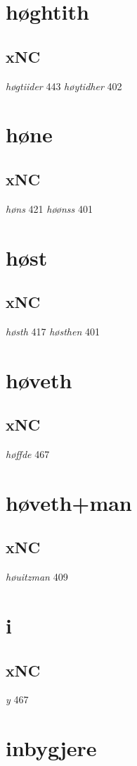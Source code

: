 \documentclass[a4paper,twocolumn]{article}
\begin{document}
\section{høghtith}
\label{sec:org12bb438}
\subsection{xNC}
\label{sec:org15979c0}
\emph{høgtiider} 443 \emph{høytidher} 402 
\section{høne}
\label{sec:org8ffc534}
\subsection{xNC}
\label{sec:orgaebe2f3}
\emph{høns} 421 \emph{høønss} 401 
\section{høst}
\label{sec:org9be2b10}
\subsection{xNC}
\label{sec:org00d6ef1}
\emph{høsth} 417 \emph{høsthen} 401 
\section{høveth}
\label{sec:orgb2b441b}
\subsection{xNC}
\label{sec:org6e9c297}
\emph{høffde} 467 
\section{høveth+man}
\label{sec:org448af07}
\subsection{xNC}
\label{sec:orgacbe502}
\emph{høuitzman} 409 
\section{i}
\label{sec:org4622994}
\subsection{xNC}
\label{sec:orgf61c54c}
\emph{y} 467 
\section{inbygjere}
\label{sec:org2d8ebcb}
\end{document}
